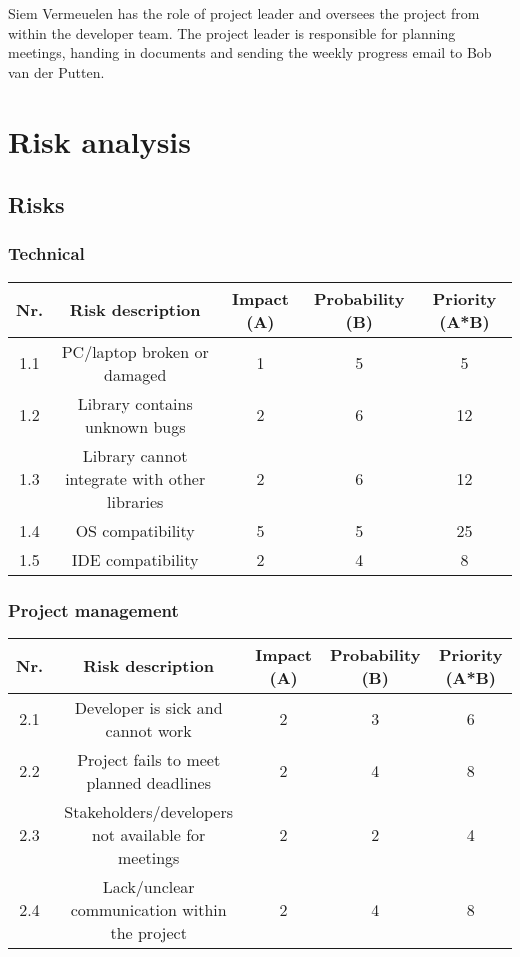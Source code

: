 \documentclass{article} %
\begin{document}
    Siem Vermeuelen has the role of project leader and oversees the project from within the developer team. The project leader is responsible for planning meetings, handing in documents and sending the weekly progress email to Bob van der Putten.
    
    \newpage

    \section{Risk analysis}
   
   	\subsection{Risks}
    
    \subsubsection{Technical}
    
    \begin{center}
    	\begin{tabular}{|c | c | c | c | c |} 
    		\hline
    		Nr. & Risk description & Impact (A) & Probability (B) & Priority (A*B) \\ [0.5ex] 
    		\hline\hline
    		1.1 & PC/laptop broken or damaged & 1 & 5  & 5 \\ 
    		\hline
    		1.2 & Library contains unknown bugs & 2 & 6 & 12 \\
    		\hline
    		1.3 & Library cannot integrate with other libraries & 2 & 6 & 12 \\
    		\hline
    		1.4 & OS compatibility & 5 & 5 & 25 \\
    		\hline
    		1.5 & IDE compatibility & 2 & 4 & 8 \\
    		\hline
    	\end{tabular}
    \end{center}

	\subsubsection{Project management}

	\begin{center}
		\begin{tabular}{|c | c | c | c | c |} 
			\hline
			Nr. & Risk description & Impact (A) & Probability (B) & Priority (A*B) \\ [0.5ex] 
			\hline\hline
			2.1 & Developer is sick and cannot work & 2 & 3  & 6 \\ 
			\hline
			2.2 & Project fails to meet planned deadlines & 2 & 4 & 8 \\
			\hline
			2.3 & Stakeholders/developers not available for meetings & 2 & 2 & 4 \\
			\hline
			2.4 & Lack/unclear communication within the project & 2 & 4 & 8 \\
			\hline
		\end{tabular}
	\end{center}
	
\end{document}
